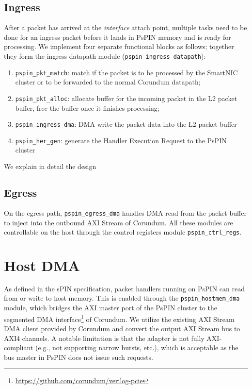 \subsection{Ingress}

After a packet has arrived at the \emph{interface} attach point, multiple tasks need to be done for an ingress packet before it lands in PsPIN memory and is ready for processing.  We implement four separate functional blocks as follows; together they form the ingress datapath module (\texttt{pspin\_ingress\_datapath}):

\begin{enumerate}
    \item \texttt{pspin\_\-pkt\_\-match}: match if the packet is to be processed by the SmartNIC cluster or to be forwarded to the normal Corundum datapath;
    \item \texttt{pspin\_\-pkt\_\-alloc}: allocate buffer for the incoming packet in the L2 packet buffer, free the buffer once it finishes processing;
    \item \texttt{pspin\_\-ingress\_\-dma}: DMA write the packet data into the L2 packet buffer
    \item \texttt{pspin\_\-her\_\-gen}: generate the Handler Execution Request to the PsPIN cluster
\end{enumerate}

We explain in detail the design 

\subsection{Egress}

On the egress path, \texttt{pspin\_egress\_dma} handles DMA read from the packet buffer to inject into the outbound AXI Stream of Corundum.  All these modules are controllable on the host through the control registers module \texttt{pspin\_ctrl\_regs}.

\section{Host DMA}

As defined in the sPIN specification, packet handlers running on PsPIN can read from or write to host memory.  This is enabled through the \texttt{pspin\_hostmem\_dma} module, which bridges the AXI master port of the PsPIN cluster to the segmented DMA interface\footnote{\url{https://github.com/corundum/verilog-pcie}} of Corundum.  We utilize the existing AXI Stream DMA client provided by Corundum and convert the output AXI Stream bus to AXI4 channels.  A notable limitation is that the adapter is not fully AXI-compliant (e.g., not supporting narrow bursts, etc.), which is acceptable as the bus master in PsPIN does not issue such requests.

